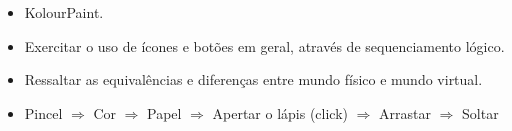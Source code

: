 \begin{itemize}
	\item KolourPaint.
	\item Exercitar o uso de ícones e botões em geral, através de sequenciamento lógico.
	\item Ressaltar as equivalências e diferenças entre mundo físico e mundo virtual.
	\item Pincel $\Rightarrow$ Cor $\Rightarrow$ Papel $\Rightarrow$ Apertar o lápis (click) $\Rightarrow$ Arrastar $\Rightarrow$ Soltar
\end{itemize}